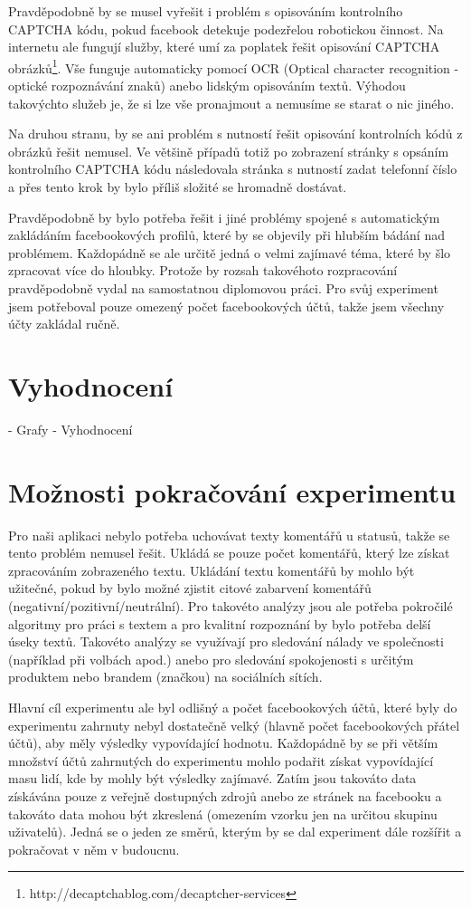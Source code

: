\documentclass[thesis=M,czech]{FITthesis}[2013/05/10]
\begin{document}
Pravděpodobně by se musel vyřešit i problém s opisováním kontrolního CAPTCHA kódu, pokud facebook detekuje podezřelou robotickou činnost. Na internetu ale fungují služby, které umí za poplatek řešit opisování CAPTCHA obrázků\footnote{http://decaptchablog.com/decaptcher-services}. Vše funguje automaticky pomocí OCR (Optical character recognition - optické rozpoznávání znaků) anebo lidským opisováním textů. Výhodou takovýchto služeb je, že si lze vše pronajmout a nemusíme se starat o nic jiného. 

Na druhou stranu, by se ani problém s nutností řešit opisování kontrolních kódů z obrázků řešit nemusel. Ve většině případů totiž po zobrazení stránky s opsáním kontrolního CAPTCHA kódu následovala stránka s nutností zadat telefonní číslo a přes tento krok by bylo příliš složité se hromadně dostávat.

Pravděpodobně by bylo potřeba řešit i jiné problémy spojené s automatickým zakládáním facebookových profilů, které by se objevily při hlubším bádání nad problémem. Každopádně se ale určitě jedná o velmi zajímavé téma, které by šlo zpracovat více do hloubky. Protože by rozsah takovéhoto rozpracování pravděpodobně vydal na samostatnou diplomovou práci. Pro svůj experiment jsem potřeboval pouze omezený počet facebookových účtů, takže jsem všechny účty zakládal ručně.

\section{Vyhodnocení}
- Grafy
- Vyhodnocení


\section{Možnosti pokračování experimentu}

Pro naši aplikaci nebylo potřeba uchovávat texty komentářů u statusů, takže se tento problém nemusel řešit. Ukládá se pouze počet komentářů, který lze získat zpracováním zobrazeného textu. Ukládání textu komentářů by mohlo být užitečné, pokud by bylo možné zjistit citové zabarvení komentářů (negativní/pozitivní/neutrální). Pro takovéto analýzy jsou ale potřeba pokročilé algoritmy pro práci s textem a pro kvalitní rozpoznání by bylo potřeba delší úseky textů. Takovéto analýzy se využívají pro sledování nálady ve společnosti (například při volbách apod.) anebo pro sledování spokojenosti s určitým produktem nebo brandem (značkou) na sociálních sítích. 

Hlavní cíl experimentu ale byl odlišný a počet facebookových účtů, které byly do experimentu zahrnuty nebyl dostatečně velký (hlavně počet facebookových přátel účtů), aby měly výsledky vypovídající hodnotu. Každopádně by se při větším množství účtů zahrnutých do experimentu mohlo podařit získat vypovídající masu lidí, kde by mohly být výsledky zajímavé. Zatím jsou takováto data získávána pouze z veřejně dostupných zdrojů anebo ze stránek na facebooku a takováto data mohou být zkreslená (omezením vzorku jen na určitou skupinu uživatelů). Jedná se o jeden ze směrů, kterým by se dal experiment dále rozšířit a pokračovat v něm v budoucnu.
\end{document}
